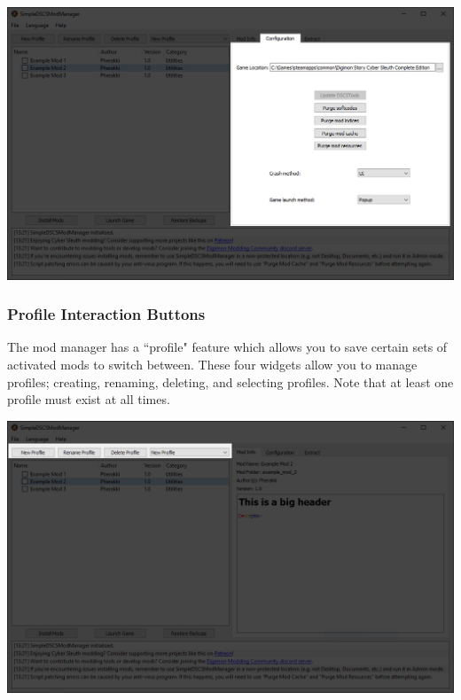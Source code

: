 \documentclass{article}
\begin{document}
\begin{center}
  \includegraphics[scale=0.4]{img/modmanager_ui_config.jpg}
\end{center}
\newpage

\subsubsection{Profile Interaction Buttons}
The mod manager has a ``profile" feature which allows you to save certain sets of activated mods to switch between. These four widgets allow you to manage profiles; creating, renaming, deleting, and selecting profiles. Note that at least one profile must exist at all times.
\begin{center}
  \includegraphics[scale=0.4]{img/modmanager_ui_profileinteraction.jpg}
\end{center}
\end{document}
